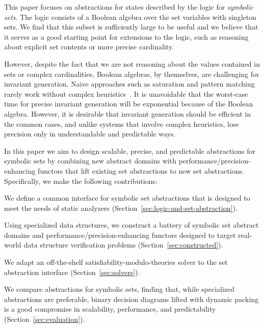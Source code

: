 This paper focuses on abstractions for states described by the logic for \emph{symbolic sets}.  The logic consists of a Boolean algebra over the set variables with singleton sets. We find that this subset is sufficiently large to be useful and we
believe that it serves as a good starting point for extensions to the
logic, such as reasoning about explicit set contents or more precise
cardinality.

However, despite the fact that we are not reasoning about the values
contained in sets or complex cardinalities, Boolean algebras, by
themselves, are challenging for invariant generation.
Naive approaches such as saturation and pattern matching rarely work
without complex heuristics~\cite{fixbag:cav:11,ab:ecoop:13}.
It is unavoidable that the worst-case time for precise invariant
generation will be exponential because of the Boolean algebra.
However, it is desirable that invariant generation should be efficient
in the common cases, and unlike systems that involve complex heuristics,
lose precision only in understandable and predictable ways.

In this paper we aim to design scalable, precise, and predictable abstractions for symbolic sets by combining new abstract domains with performance/precision-enhancing functors that lift existing set abstractions to new set abstractions.  Specifically, we make the following contributions:
%
\begin{compactitem}
\item We define a common interface for symbolic set abstractions that is designed to meet the needs of static analyzers (Section~\ref{sec:logic-and-set-abstraction}).
%
\item Using specialized data structures, we construct a battery of symbolic set abstract domains and performance/precision-enhancing functors designed to target real-world data structure verification problems (Section~\ref{sec:constructed}).
%
\item We adapt an off-the-shelf satisfiability-modulo-theories solver to the set abstraction interface (Section~\ref{sec:solvers}).
%
\item We compare abstractions for symbolic sets, finding that, while specialized abstractions are preferable, binary decision diagrams lifted with dynamic packing is a good compromise in scalability, performance, and predictability (Section~\ref{sec:evaluation}).
%
\end{compactitem}